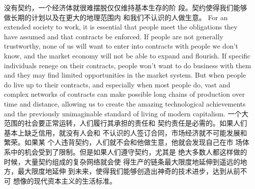 \begin{paracol}{2}
\switchcolumn
没有契约，一个经济体就很难摆脱仅仅维持基本生存的阶
段。契约使得我们能够做长期的计划以及在更大的地理范围内
和我们不认识的人做生意。
\switchcolumn*
For an extended society to work, it is essential that people
meet the obligations they have assumed and that contracts be
enforced. If people are not generally trustworthy, none of us will
want to enter into contracts with people we don't know, and
the market economy will not be able to expand and flourish. If
specific individuals renege on their contracts, people won't
want to do business with them and they may find limited opportunities in the market system. But when people do live up to
their contracts, and especially when most people do, vast and
complex networks of contracts can make possible long chains of
production over time and distance, allowing us to create the
amazing technological achievements and the previously
unimaginable standard of living of modern capitalism.
\switchcolumn
一个大范围的社会要正常运转，人们履行其承担的责任和
契约责任是必需的。如果人们基本上缺乏信用，就没有人会和
不认识的人签订合同，市场经济就不可能发展和繁荣。如果某
个人违背契约，人们就不会和他做生意，他就会发现自己在市
场体系中的机会受到了限制。但是如果人们遵守契约，尤其是
绝大多数人都这样做的时候，大量契约组成的复杂网络就会使
得生产的链条最大限度地延伸到遥远的地方，最大限度地延伸
到未来，使得我们能够创造出神奇的技术进步，达到从前不可
想像的现代资本主义的生活标准。



\end{paracol}
